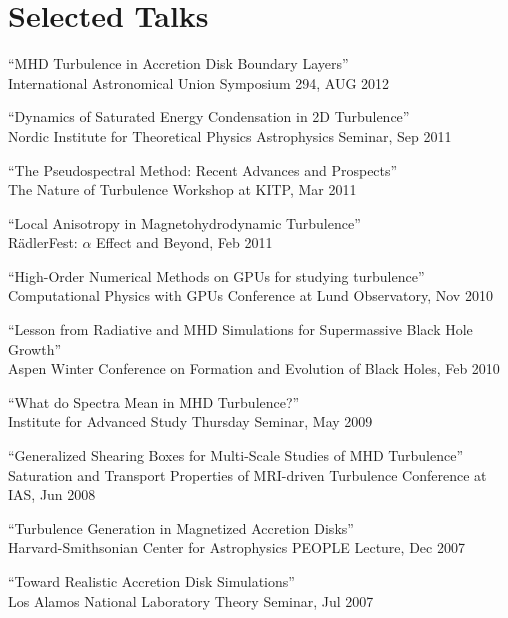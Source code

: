 \section*{Selected Talks}

\begin{ilist}

\item ``MHD Turbulence in Accretion Disk Boundary Layers''\\
  International Astronomical Union Symposium 294, AUG 2012

\item ``Dynamics of Saturated Energy Condensation in 2D Turbulence''\\
  Nordic Institute for Theoretical Physics Astrophysics Seminar, Sep 2011

\item ``The Pseudospectral Method: Recent Advances and Prospects''\\
  The Nature of Turbulence Workshop at KITP, Mar 2011

\item ``Local Anisotropy in Magnetohydrodynamic Turbulence''\\
  R{\"a}dlerFest: $\alpha$ Effect and Beyond, Feb 2011

\item ``High-Order Numerical Methods on GPUs for studying turbulence''\\
  Computational Physics with GPUs Conference at Lund Observatory, Nov 2010

\item ``Lesson from Radiative and MHD Simulations for Supermassive Black Hole Growth''\\
  Aspen Winter Conference on Formation and Evolution of Black Holes, Feb 2010

\item ``What do Spectra Mean in MHD Turbulence?''\\
  Institute for Advanced Study Thursday Seminar, May 2009

\item ``Generalized Shearing Boxes for Multi-Scale Studies of MHD Turbulence''\\
  Saturation and Transport Properties of MRI-driven Turbulence Conference at IAS, Jun 2008

\item ``Turbulence Generation in Magnetized Accretion Disks''\\
  Harvard-Smithsonian Center for Astrophysics PEOPLE Lecture, Dec 2007

\item ``Toward Realistic Accretion Disk Simulations''\\
  Los Alamos National Laboratory Theory Seminar, Jul 2007

\end{ilist}
